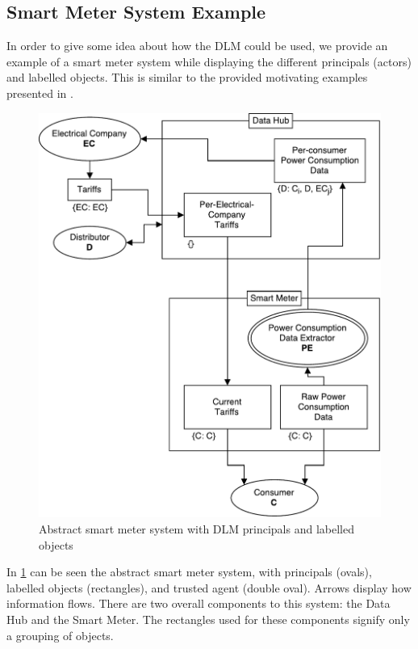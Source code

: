 \subsection{Smart Meter System Example}\label{dlm-example}
In order to give some idea about how the DLM could be used, we provide an example of a smart meter system while displaying the different principals (actors) and labelled objects.
This is similar to the provided motivating examples presented in \citet{myers1997decentralized}.

\begin{figure}[h]
\centering
\includegraphics[width=\textwidth]{figures/dlm_sm_example.pdf}
\caption{Abstract smart meter system with DLM principals and labelled objects}
\label{dlm:sm_example}
\end{figure}

In \cref{dlm:sm_example} can be seen the abstract smart meter system, with principals (ovals), labelled objects (rectangles), and trusted agent (double oval).
Arrows display how information flows.
There are two overall components to this system: the Data Hub and the Smart Meter.
The rectangles used for these components signify only a grouping of objects.

